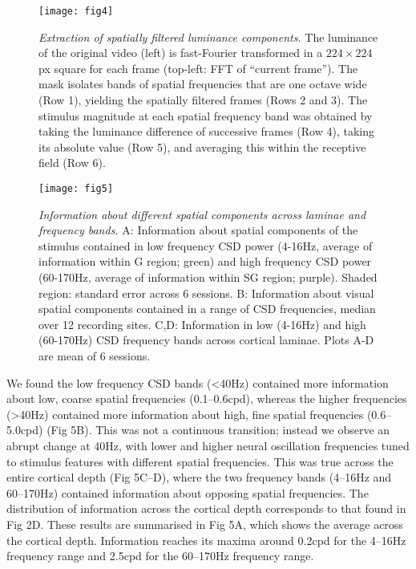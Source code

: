 \begin{figure}[htbp]
\centering \texttt{[image: fig4]}
%
\caption{%
\textit{Extraction of spatially filtered luminance components.}
The luminance of the original video (left) is 
fast-Fourier transformed in a $224 \times 224$ px square for each frame (top-left: FFT of 
``current frame'').
The mask isolates bands of spatial frequencies that are one octave wide (Row 1), yielding 
the spatially filtered frames (Rows 2 and 3).
The stimulus magnitude at each spatial frequency band was obtained 
by taking the luminance difference of successive frames (Row 4), 
taking its absolute value (Row 5), 
and averaging this within the receptive field (Row 6).
}%
\label{fig:lam_4}
%
\end{figure}

\begin{figure}[htbp]
\centering \texttt{[image: fig5]}
%
\caption{%
\textit{Information about different spatial components across laminae and frequency bands.}
A: Information about spatial components of the stimulus contained in 
low frequency CSD power (4-16Hz, average of information within G region; green) and high 
frequency CSD power (60-170Hz, average of information within SG region; purple). Shaded region: standard error across 6 sessions.
B: Information about visual spatial components contained in a range of CSD frequencies, median over 12 recording sites.
C,D: Information in low (4-16Hz) and high (60-170Hz) 
CSD frequency bands across cortical laminae.
Plots A-D are mean of 6 sessions.}%
\label{fig:lam_5}
%
\end{figure}

We found the low frequency CSD bands ({\textless}40Hz) contained more information about low, coarse spatial frequencies (0.1--0.6cpd), whereas the higher frequencies ({\textgreater}40Hz) contained more information about high, fine spatial frequencies (0.6--5.0cpd) (Fig 5B). This was not a continuous transition; instead we observe an abrupt change at 40Hz, with lower and higher neural oscillation frequencies tuned to stimulus features with different spatial frequencies. This was true across the entire cortical depth (Fig 5C--D), where the two frequency bands (4--16Hz and 60--170Hz) contained information about opposing spatial frequencies. The distribution of information across the cortical depth corresponds to that found in Fig 2D. These results are summarised in Fig 5A, which shows the average across the cortical depth. Information reaches its maxima around 0.2cpd for the 4--16Hz frequency range and 2.5cpd for the 60--170Hz frequency range.

